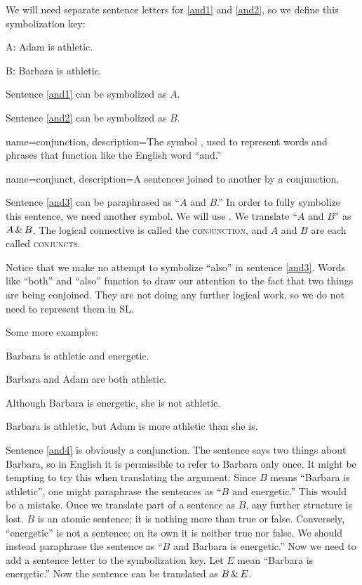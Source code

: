 We will need separate sentence letters for \ref{and1} and \ref{and2}, so we define this symbolization key:
\begin{ekey}
\item[A:] Adam is athletic.
\item[B:] Barbara is athletic.
\end{ekey}

Sentence \ref{and1} can be symbolized as $A$.

Sentence \ref{and2} can be symbolized as $B$.

{
name=conjunction,
description={The symbol \eand, used to represent words and phrases that function like the English word ``and.''}
}

{
name=conjunct,
description={A sentences joined to another by a conjunction.}
}

Sentence \ref{and3} can be paraphrased as ``$A$ and $B$.'' In order to fully symbolize this sentence, we need another symbol. We will use \eand. We translate ``$A$ and $B$'' as $A\,\&\, B$. The logical connective \eand is called the \textsc{\gls{conjunction}}, \label{def:conjunction} and $A$ and $B$ are each called \textsc{\glspl{conjunct}}. \label{def:conjunct}
 

Notice that we make no attempt to symbolize ``also'' in sentence \ref{and3}. Words like ``both'' and ``also'' function to draw our attention to the fact that two things are being conjoined. They are not doing any further logical work, so we do not need to represent them in SL.

Some more examples:
\begin{earg}
\item[\ex{and4}]Barbara is athletic and energetic.
\item[\ex{and5}]Barbara and Adam are both athletic.
\item[\ex{and6}]Although Barbara is energetic, she is not athletic.
\item[\ex{and7}]Barbara is athletic, but Adam is more athletic than she is.
\end{earg}

Sentence \ref{and4} is obviously a conjunction. The sentence says two things about Barbara, so in English it is permissible to refer to Barbara only once. It might be tempting to try this when translating the argument: Since $B$ means ``Barbara is athletic'', one might paraphrase the sentences as ``$B$ and energetic.'' This would be a mistake. Once we translate part of a sentence as $B$, any further structure is lost. $B$ is an atomic sentence; it is nothing more than true or false. Conversely, ``energetic'' is not a sentence; on its own it is neither true nor false. We should instead paraphrase the sentence as ``$B$ and Barbara is energetic.'' Now we need to add a sentence letter to the symbolization key. Let $E$ mean ``Barbara is energetic.'' Now the sentence can be translated as $B \,\&\, E$.

